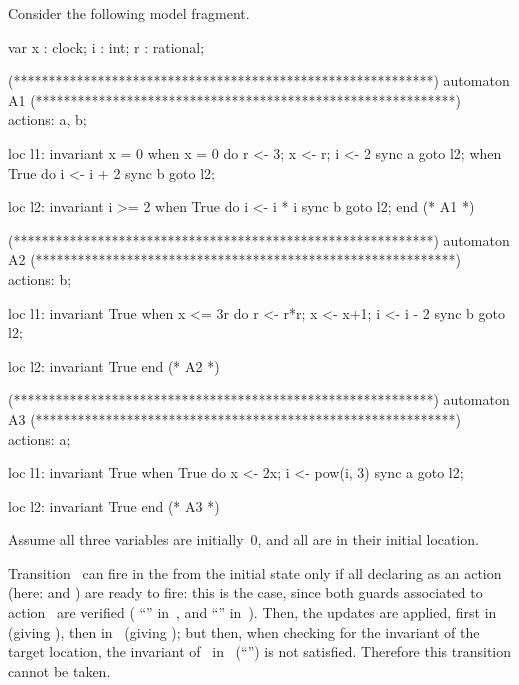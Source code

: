 \begin{example}\label{example:sync-model-updates}
Consider the following \imitator{} model fragment.

\begin{IMITATORmodel}
var
	x : clock;
	i : int;
	r : rational;

(************************************************************)
  automaton A1
(************************************************************)
actions: a, b;

loc l1: invariant x = 0
	when x = 0 do {r <- 3; x <- r; i <- 2} sync a goto l2;
	when True do {i <- i + 2} sync b goto l2;

loc l2: invariant i >= 2
	when True do {i <- i * i} sync b goto l2;
end (* A1 *)

(************************************************************)
  automaton A2
(************************************************************)
actions: b;

loc l1: invariant True
	when x <= 3r do {r <- r*r; x <- x+1; i <- i - 2} sync b goto l2;

loc l2: invariant True
end (* A2 *)


(************************************************************)
  automaton A3
(************************************************************)
actions: a;

loc l1: invariant True
	when True do {x <- 2x; i <- pow(i, 3)} sync a goto l2;

loc l2: invariant True
end (* A3 *)
\end{IMITATORmodel}

Assume all three variables are initially~0, and all \IPTA{} are in their initial  location.

Transition~ can fire in the \NIPTA{} from the initial state only if all \IPTA{} declaring  as an action (here:  and ) are ready to fire: this is the case, since both guards associated to action~ are verified (\ie{} ``'' in~, and ``'' in~).
Then, the updates are applied, first in~ (giving ), then in~ (giving );
but then, when checking for the invariant of the target location, the invariant of~ in~ (``'') is not satisfied.
Therefore this transition cannot be taken.


\end{example}
